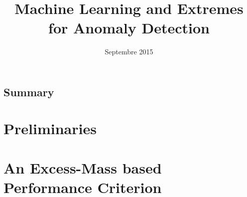 \documentclass[draft]{ecsthesis}      %
\begin{document}
\begingroup
  \makeatletter
  \let\BR@bibitem\BRatbibitem
  \nobibliography*
\endgroup
\frontmatter
\title      {Machine Learning and Extremes for Anomaly Detection}
\date       {Septembre 2015}
\subject    {PhD Thesis}
\maketitle


\tableofcontents
\listoffigures
\listoftables
%
%
%
%
%
%
%

\mainmatter
\chapter{Summary}\label{chap:intro}


\part{Preliminaries}\label{part:background}


\part{An Excess-Mass based Performance Criterion}\label{part:struct}

\end{document}

